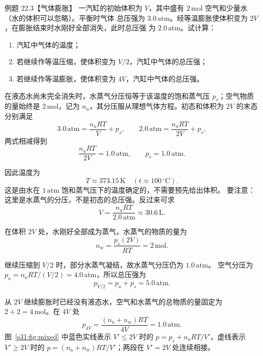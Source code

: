 \begin{origexamplebox}{例题 22.3【气体膨胀】}
一汽缸的初始体积为 $V$，其中盛有 $2\,\mathrm{mol}$ 空气和少量水（水的体积可以忽略）。平衡时气体
总压强为 $3.0\,\mathrm{atm}$。经等温膨胀使体积变为 $2V$，在膨胀结束时水刚好全部消失，此时总压强
为 $2.0\,\mathrm{atm}$。试计算：
\begin{enumerate}[label=\arabic*.]
  \item 汽缸中气体的温度；
  \item 若继续作等温压缩，使体积变为 $V/2$，汽缸中气体的总压强；
  \item 若继续作等温膨胀，使体积变为 $4V$，汽缸中气体的总压强。
\end{enumerate}
\end{origexamplebox}

\begin{xesolution}
在液态水尚未完全消失时，水蒸气分压恒等于该温度的饱和蒸气压 $p_s$；空气物质的量始终是
$2\,\mathrm{mol}$，记为 $n_a$，其分压服从理想气体方程。初态和体积为 $2V$ 的末态分别满足
\[
  3.0\,\mathrm{atm}=\frac{n_aRT}{V}+p_s,
  \qquad
  2.0\,\mathrm{atm}=\frac{n_aRT}{2V}+p_s,
\]
两式相减得到
\[
  \frac{n_aRT}{2V}=1.0\,\mathrm{atm},
  \qquad p_s=1.0\,\mathrm{atm}.
\]

\mixedGasPVFigure
{}\label{s31:fig:mixed}

因此温度为
\[
  \boxed{T\approx373.15\,\mathrm K\quad(t\approx100\,{}^\circ\mathrm C)}.
\]
这是由水在 $1\,\mathrm{atm}$ 饱和蒸气压下的温度确定的，不需要预先给出体积。
要注意：这里是水蒸气的分压，不是初态的总压强。反过来可求
\[V=\frac{n_aRT}{2.0\,\mathrm{atm}}\approx30.6\,\mathrm L.\]

在体积 $2V$ 处，水刚好全部成为蒸气，水蒸气的物质的量为
\[
  n_w=\frac{p_s(2V)}{RT}=2\,\mathrm{mol}.
\]

继续压缩到 $V/2$ 时，部分水蒸气凝结，故水蒸气分压仍为 $1.0\,\mathrm{atm}$。
空气分压为 $p_a=n_aRT/(V/2)=4.0\,\mathrm{atm}$，所以总压强为
\[
  \boxed{p_{V/2}=p_a+p_s=5.0\,\mathrm{atm}}.
\]

从 $2V$ 继续膨胀时已经没有液态水，空气和水蒸气的总物质的量固定为 $2+2=4\,\mathrm{mol}$。在
$4V$ 处
\[
  \boxed{p_{4V}=\frac{(n_a+n_w)RT}{4V}=1.0\,\mathrm{atm}}.
\]
图~\ref{s31:fig:mixed} 中蓝色实线表示 $V'\le2V$ 时的 $p=p_s+n_aRT/V'$，虚线表示 $V'\ge2V$ 时的 $p=(n_a+n_w)RT/V'$；两段在
$V'=2V$ 处连续相接。
\end{xesolution}

